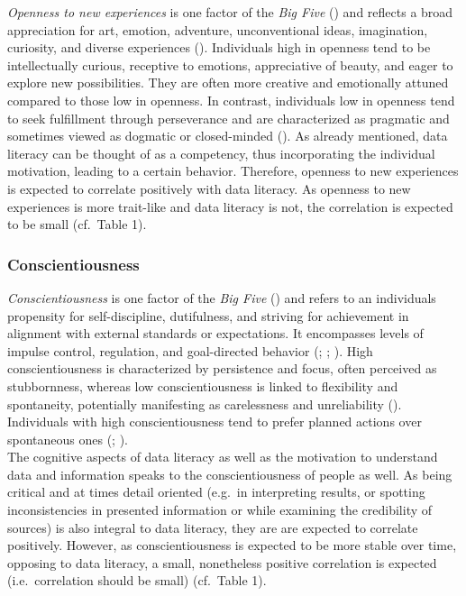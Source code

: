 \documentclass[
  12pt,
  a4paper,
  twoside]{article}
\begin{document}
\emph{Openness to new experiences} is one factor of the \emph{Big Five} () and reflects a broad appreciation for art, emotion, adventure, unconventional ideas, imagination, curiosity, and diverse experiences (). Individuals high in openness tend to be intellectually curious, receptive to emotions, appreciative of beauty, and eager to explore new possibilities. They are often more creative and emotionally attuned compared to those low in openness. In contrast, individuals low in openness tend to seek fulfillment through perseverance and are characterized as pragmatic and sometimes viewed as dogmatic or closed-minded (). As already mentioned, data literacy can be thought of as a competency, thus incorporating the individual motivation, leading to a certain behavior. Therefore, openness to new experiences is expected to correlate positively with data literacy. As openness to new experiences is more trait-like and data literacy is not, the correlation is expected to be small (cf.~Table 1).

\subsubsection{Conscientiousness}\label{conscientiousness}

\emph{Conscientiousness} is one factor of the \emph{Big Five} () and refers to an individuals propensity for self-discipline, dutifulness, and striving for achievement in alignment with external standards or expectations. It encompasses levels of impulse control, regulation, and goal-directed behavior (; ; ). High conscientiousness is characterized by persistence and focus, often perceived as stubbornness, whereas low conscientiousness is linked to flexibility and spontaneity, potentially manifesting as carelessness and unreliability (). Individuals with high conscientiousness tend to prefer planned actions over spontaneous ones (; ).\\
The cognitive aspects of data literacy as well as the motivation to understand data and information speaks to the conscientiousness of people as well. As being critical and at times detail oriented (e.g.~in interpreting results, or spotting inconsistencies in presented information or while examining the credibility of sources) is also integral to data literacy, they are are expected to correlate positively. However, as conscientiousness is expected to be more stable over time, opposing to data literacy, a small, nonetheless positive correlation is expected (i.e.~correlation should be small) (cf.~Table 1).
\end{document}
